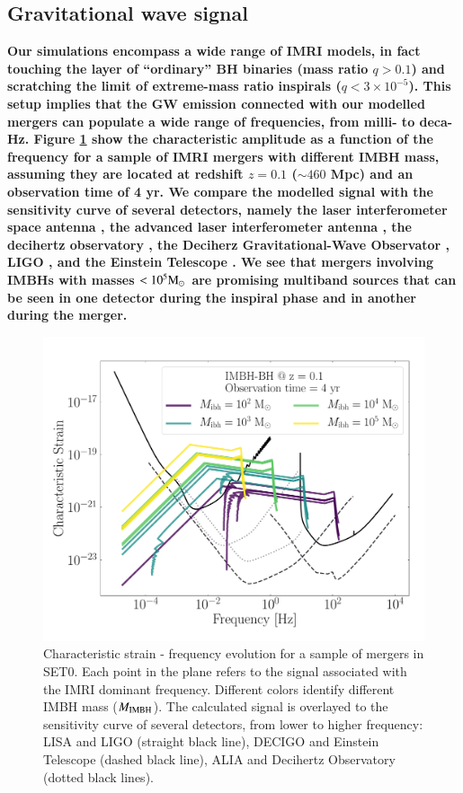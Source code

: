 \documentclass[article]{aa}
\newcommand{\Ms}{{\rm M}_\odot}
\newcommand{\ibh}{{\rm IMBH}}
\begin{document}
\subsection{Gravitational wave signal}
{\bf
Our simulations encompass a wide range of IMRI models, in fact touching the layer of ``ordinary'' BH binaries (mass ratio $q>0.1$) and 
scratching the limit of extreme-mass ratio inspirals ($q < 3 \times10^{-5}$). This setup implies that the GW emission connected with our modelled mergers can populate a wide range of frequencies, from milli- to deca-Hz. Figure \ref{fig:f13} show the characteristic amplitude \citep{kocsis12,ASLiK18,seoane18,robson19} as a function of the frequency for a sample of IMRI mergers with different IMBH mass, assuming they are located at redshift $z=0.1$ ($\sim 460$ Mpc) and an observation time of 4 yr. We compare the modelled signal with the sensitivity curve of several detectors, namely the laser interferometer space antenna \citep[LISA,][]{eLISA13,amaro17lisa}, the advanced laser interferometer antenna \citep[ALIA,][]{bender13}, the decihertz observatory \citep[DO,]{arca19}, the Deciherz Gravitational-Wave Observator \citep[DECIGO,]{Kawamura11}, LIGO \citep{abbott16}, and the Einstein Telescope \citep[ET]{punturo10}. We see that mergers involving IMBHs with masses $< 10^5\Ms$ are promising multiband sources that can be seen in one detector during the inspiral phase and in another during the merger. 

\begin{figure}
\centering
\includegraphics[width=\columnwidth]{test}
\caption{Characteristic strain - frequency evolution for a sample of mergers in SET0. Each point in the plane refers to the signal associated with the IMRI dominant frequency. Different colors identify different IMBH mass ($M_\ibh$). The calculated signal is overlayed to the sensitivity curve of several detectors, from lower to higher frequency: LISA and LIGO (straight black line), DECIGO and Einstein Telescope (dashed black line), ALIA and Decihertz Observatory (dotted black lines).}
\label{fig:f13}
\end{figure}

}
\end{document}
